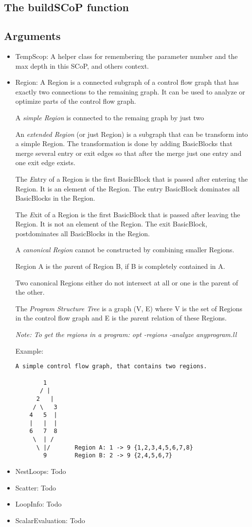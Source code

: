 \documentclass[a4paper,10pt]{article}
\begin{document}
\subsection{The buildSCoP function}

\subsection{Arguments}
\begin{itemize}
\item TempScop: A helper class for remembering the parameter number and the max depth in this SCoP, and others context.
\item Region:  A Region is a connected subgraph of a control flow graph that has exactly
two connections to the remaining graph. It can be used to analyze or
optimize parts of the control flow graph.

A  \emph {simple Region}  is connected to the remaing graph by just two

An \emph  {extended Region}  (or just Region) is a subgraph that can be
transform into a simple Region. The transformation is done by adding
BasicBlocks that merge several entry or exit edges so that after the merge
just one entry and one exit edge exists.

The \emph Entry of a Region is the first BasicBlock that is passed after
entering the Region. It is an element of the Region. The entry BasicBlock
dominates all BasicBlocks in the Region.

The \emph Exit of a Region is the first BasicBlock that is passed after
leaving the Region. It is not an element of the Region. The exit BasicBlock,
postdominates all BasicBlocks in the Region.

A \emph {canonical Region}  cannot be constructed by combining smaller
Regions.

Region A is the \emph parent of Region B, if B is completely contained in A.

Two canonical Regions either do not intersect at all or one is
the parent of the other.

The \emph {Program Structure Tree} is a graph (V, E) where V is the set of
Regions in the control flow graph and E is the \emph parent relation of these
Regions.

\emph {Note: To get the regions in a program: opt -regions -analyze anyprogram.ll}

Example:
\begin{verbatim}
A simple control flow graph, that contains two regions.

        1
       / |
      2   |
     / \   3
    4   5  |
    |   |  |
    6   7  8
     \  | /
      \ |/       Region A: 1 -> 9 {1,2,3,4,5,6,7,8}
        9        Region B: 2 -> 9 {2,4,5,6,7}
\end{verbatim}

\item NestLoops: Todo
\item Scatter: Todo
\item LoopInfo: Todo
\item ScalarEvaluation: Todo
\end{itemize}
\end{document}
